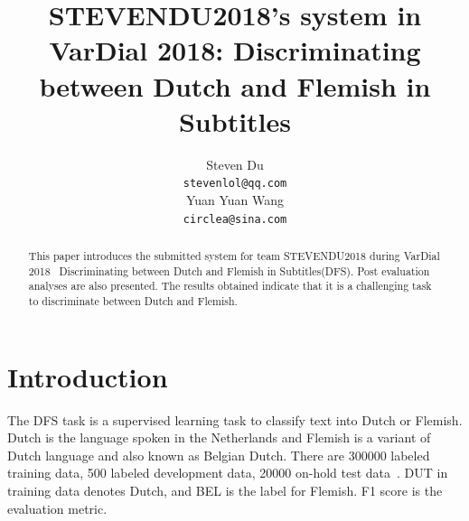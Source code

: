 \documentclass[11pt]{article}
\title{STEVENDU2018's system in VarDial 2018: Discriminating between Dutch and Flemish in Subtitles}
\author{Steven Du \\
	{\tt\footnotesize  stevenlol@qq.com} \\
	\And
	Yuan Yuan Wang \\
	{\tt\footnotesize  circlea@sina.com} 
	}
\date{}
\begin{document}
\maketitle


\begin{abstract}
  This paper introduces the submitted system for team STEVENDU2018 during VarDial 2018~\cite{zampieri-EtAl:2018:VarDial} Discriminating between Dutch and Flemish in Subtitles(DFS). Post evaluation analyses are also presented. The results obtained indicate that it is a challenging task to discriminate between Dutch and Flemish.
\end{abstract}


\section{Introduction}
\label{intro}

%
% 
The DFS task
is a supervised learning task to classify text into Dutch or Flemish. Dutch is the language spoken in the Netherlands and Flemish is a variant of Dutch language and also known as Belgian Dutch. There are 300000 labeled training data, 500 labeled development data, 20000 on-hold test data~\cite{vanderlee:2017:VarDial}. DUT in training data denotes Dutch, and BEL is the label for Flemish. F1 score is the evaluation metric.  %
\end{document}
